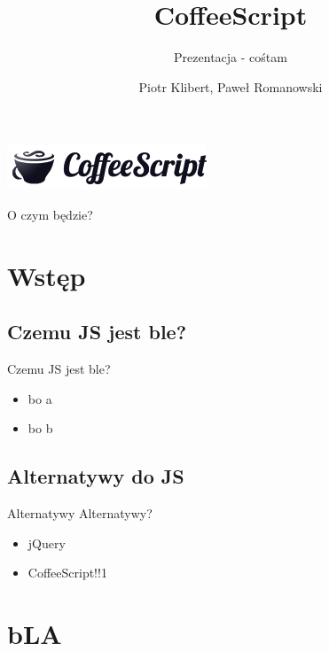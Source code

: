 \documentclass[xcolor=dvipsnames]{beamer}
\title{CoffeeScript}
\subtitle{Prezentacja - cośtam}
\author{Piotr Klibert, Paweł Romanowski}
\begin{document}
\begin{frame}[plain]
    \begin{center}
        \includegraphics[scale=0.25]{img/logo.png}
    \end{center}
    \titlepage
\end{frame}

\begin{frame}{O czym będzie?}
    \tableofcontents
\end{frame}

\section{Wstęp}

\subsection{Czemu JS jest ble?}

\begin{frame}[fragile]{Czemu JS jest ble?}
    \begin{itemize}
        \item bo a
        \item bo b
    \end{itemize}
\end{frame}

\subsection{Alternatywy do JS}
\begin{frame}[fragile]{Alternatywy}
    Alternatywy?

    \begin{itemize}
        \item jQuery
        \pause   %
        \item CoffeeScript!!1
    \end{itemize}
\end{frame}

\section{bLA}
\end{document}
